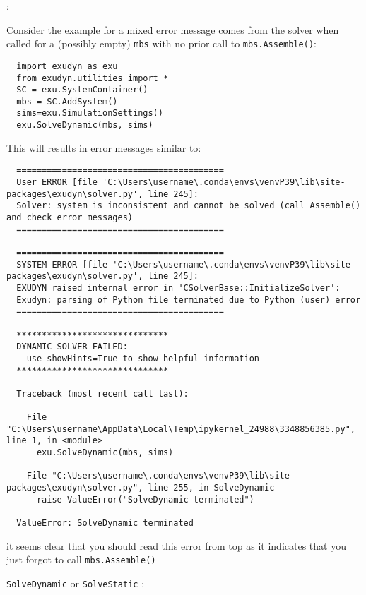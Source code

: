 \noindent {}:
\bi
\item Consider the  example for a mixed error message comes from the solver when called for a (possibly empty) \texttt{mbs} with no prior call to \texttt{mbs.Assemble()}:
\plainlststyle
\begin{lstlisting}
  import exudyn as exu
  from exudyn.utilities import *
  SC = exu.SystemContainer()
  mbs = SC.AddSystem()
  sims=exu.SimulationSettings()
  exu.SolveDynamic(mbs, sims)
\end{lstlisting}
\item This will results in error messages similar to:
\begin{lstlisting}
  =========================================
  User ERROR [file 'C:\Users\username\.conda\envs\venvP39\lib\site-packages\exudyn\solver.py', line 245]: 
  Solver: system is inconsistent and cannot be solved (call Assemble() and check error messages)
  =========================================

  =========================================
  SYSTEM ERROR [file 'C:\Users\username\.conda\envs\venvP39\lib\site-packages\exudyn\solver.py', line 245]: 
  EXUDYN raised internal error in 'CSolverBase::InitializeSolver':
  Exudyn: parsing of Python file terminated due to Python (user) error
  =========================================

  ******************************
  DYNAMIC SOLVER FAILED:
    use showHints=True to show helpful information
  ******************************
   
  Traceback (most recent call last):

    File "C:\Users\username\AppData\Local\Temp\ipykernel_24988\3348856385.py", line 1, in <module>
      exu.SolveDynamic(mbs, sims)

    File "C:\Users\username\.conda\envs\venvP39\lib\site-packages\exudyn\solver.py", line 255, in SolveDynamic
      raise ValueError("SolveDynamic terminated")

  ValueError: SolveDynamic terminated
\end{lstlisting}
\bi
\item[$\ra$] it seems clear that you should read this error from top as it indicates that you just forgot to call \texttt{mbs.Assemble()}
\ei
\item \texttt{SolveDynamic} or \texttt{SolveStatic} :
